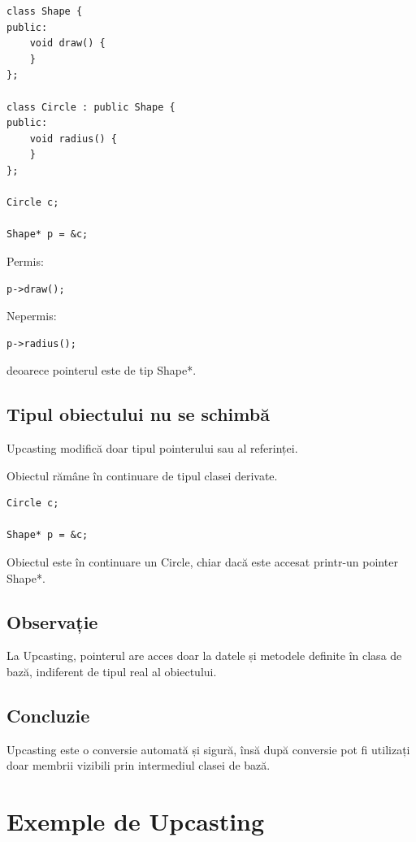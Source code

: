 \documentclass[12pt,a4paper]{article}
\begin{document}
\begin{verbatim}
class Shape {
public:
    void draw() {
    }
};

class Circle : public Shape {
public:
    void radius() {
    }
};

Circle c;

Shape* p = &c;
\end{verbatim}

Permis:

\begin{verbatim}
p->draw();
\end{verbatim}

Nepermis:

\begin{verbatim}
p->radius();
\end{verbatim}

deoarece pointerul este de tip Shape*.

\subsection{Tipul obiectului nu se schimbă}

Upcasting modifică doar tipul pointerului sau al referinței.

Obiectul rămâne în continuare de tipul clasei derivate.

\begin{verbatim}
Circle c;

Shape* p = &c;
\end{verbatim}

Obiectul este în continuare un Circle, chiar dacă este accesat printr-un pointer Shape*.

\subsection{Observație}

La Upcasting, pointerul are acces doar la datele și metodele definite în clasa de bază, indiferent de tipul real al obiectului.

\subsection{Concluzie}

Upcasting este o conversie automată și sigură, însă după conversie pot fi utilizați doar membrii vizibili prin intermediul clasei de bază.



\section{Exemple de Upcasting}
\end{document}
